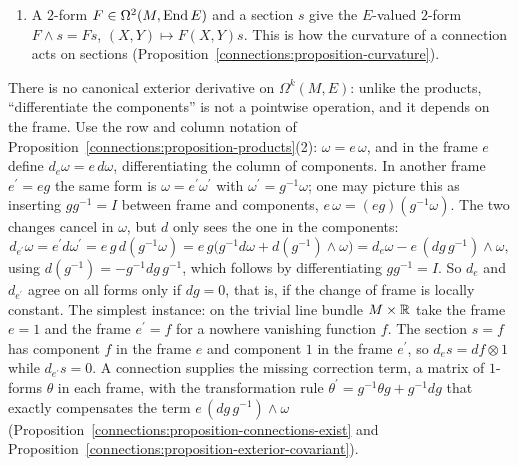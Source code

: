 \begin{example}
\begin{enumerate}
$\theta \wedge \eta = \bigl(\begin{smallmatrix} 0 & 0\\ dy \wedge dx & 0\end{smallmatrix}\bigr)$ and $\eta \wedge \theta = \bigl(\begin{smallmatrix} 0 & dx \wedge dx\\ 0 & 0\end{smallmatrix}\bigr) = 0$.
\item A $2$-form $F \in \Omega^2(M, \operatorname{End} E)$ and a section $s$ give the $E$-valued $2$-form $F \wedge s = Fs$, $(X, Y) \mapsto F(X, Y)s$. This is how the curvature of a connection acts on sections
(Proposition~\ref{connections:proposition-curvature}).
\end{enumerate}
\end{example}

\begin{remark}\label{connections:remark-no-canonical-d}
There is no canonical exterior derivative on $\Omega^k(M, E)$: unlike the products, ``differentiate the components'' is not a pointwise operation, and it depends on the frame. Use the row and
column notation of Proposition~\ref{connections:proposition-products}(2): $\omega = e\,\omega$, and in the frame $e$ define $d_e\omega = e\,d\omega$, differentiating the column of components. In another
frame $e^{\prime} = eg$ the same form is $\omega = e^{\prime}\omega^{\prime}$ with $\omega^{\prime} = g^{-1}\omega$; one may picture this as inserting $gg^{-1} = I$ between frame and components,
$e\,\omega = (eg)(g^{-1}\omega)$. The two changes cancel in $\omega$, but $d$ only sees the one in the components:
\[
d_{e^{\prime}}\omega = e^{\prime}d\omega^{\prime} = e\,g\,d(g^{-1}\omega) = e\,g\bigl(g^{-1}d\omega + d(g^{-1}) \wedge \omega\bigr) = d_e\omega - e\,(dg\,g^{-1}) \wedge \omega,
\]
using $d(g^{-1}) = -g^{-1}dg\,g^{-1}$, which follows by differentiating $gg^{-1} = I$. So $d_e$ and $d_{e^{\prime}}$ agree on all forms only if $dg = 0$, that is, if the change of frame is locally constant.
The simplest instance: on the trivial line bundle $M \times \mathbb{R}$ take the frame $e = 1$ and the frame $e^{\prime} = f$ for a nowhere vanishing function $f$. The section $s = f$ has component $f$ in the
frame $e$ and component $1$ in the frame $e^{\prime}$, so $d_es = df \otimes 1$ while $d_{e^{\prime}}s = 0$. A connection supplies the missing correction term, a matrix of $1$-forms $\theta$ in each
frame, with the transformation rule $\theta^{\prime} = g^{-1}\theta g + g^{-1}dg$ that exactly compensates the term $e\,(dg\,g^{-1}) \wedge \omega$
(Proposition~\ref{connections:proposition-connections-exist} and Proposition~\ref{connections:proposition-exterior-covariant}).
\end{remark}

